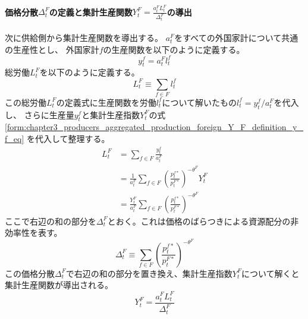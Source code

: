 \paragraph{価格分散\(\Delta_t^F\)の定義と集計生産関数\(Y_t^F=\frac{a_t^FL_t^F}{\Delta_t^F}\)の導出}
\label{sec:chapter3_producers_aggregated_production_foreign_aggregated_production_function_derivation}
次に供給側から集計生産関数を導出する。
\(a_t^F\)をすべての外国家計について共通の生産性とし、
外国家計\(f\)の生産関数を以下のように定義する。
\begin{equation}
\label{form:chapter3_producers_aggregated_production_foreign_aggregated_production_function_derivation_y_f_def}
    y_t^f=a_t^Fl_t^f
\end{equation}
総労働\(L_t^F\)を以下のように定義する。
\begin{equation}
\label{form:chapter3_producers_aggregated_production_foreign_aggregated_production_function_derivation_L_F_def}
    L_t^F\equiv\sum_{f\in F}l_t^f
\end{equation}
この総労働\(L_t^F\)の定義式に生産関数を労働\(l_t^f\)について解いたもの\(l_t^f=y_t^f/a_t^F\)を代入し、
さらに生産量\(y_t^f\)と集計生産指数\(Y_t^F\)の式
\eqref{form:chapter3_producers_aggregated_production_foreign_Y_F_definition_y_f_eq}
を代入して整理する。
\begin{align}
\label{form:chapter3_producers_aggregated_production_foreign_aggregated_production_function_derivation_L_F_eq}
    L_t^F&=\sum_{f\in F}\frac{y_t^f}{a_t^F} \nonumber \\
    &=\frac{1}{a_t^F}\sum_{f\in F}\left(\frac{p_t^{f*}}{p_t^{F*}}\right)^{-\theta^F}Y_t^F \nonumber \\
    &=\frac{Y_t^F}{a_t^F}\sum_{f\in F}\left(\frac{p_t^{f*}}{p_t^{F*}}\right)^{-\theta^F}
\end{align}
ここで右辺の和の部分を\(\Delta_t^F\)とおく。これは価格のばらつきによる資源配分の非効率性を表す。
\begin{equation}
\label{form:chapter3_producers_aggregated_production_foreign_aggregated_production_function_derivation_Delta_F_def}
    \Delta_t^F\equiv\sum_{f\in F}\left(\frac{p_t^{f*}}{p_t^{F*}}\right)^{-\theta^F}
\end{equation}
この価格分散\(\Delta_t^F\)で右辺の和の部分を置き換え、集計生産指数\(Y_t^F\)について解くと
集計生産関数が導出される。
\begin{equation}
\label{form:chapter3_producers_aggregated_production_foreign_aggregated_production_function_derivation_Y_F_eq}
    Y_t^F=\frac{a_t^FL_t^F}{\Delta_t^F}
\end{equation}